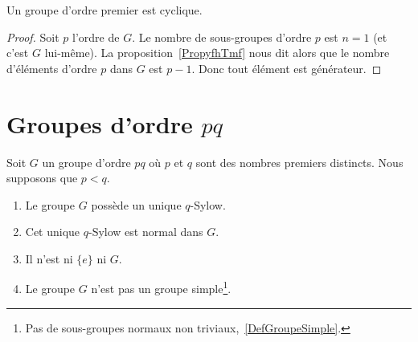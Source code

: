 \begin{corollary}
    Un groupe d'ordre premier est cyclique.
\end{corollary}

\begin{proof}
    Soit \( p\) l'ordre de \( G\). Le nombre de sous-groupes d'ordre \( p\) est \( n=1\) (et c'est \( G\) lui-même). La proposition~\ref{PropyfhTmf} nous dit alors que le nombre d'éléments d'ordre \( p\) dans \( G\) est \( p-1\). Donc tout élément est générateur.
\end{proof}

\section{Groupes d'ordre \texorpdfstring{$ pq$}{pq}}

\begin{lemma}
    Soit \( G\) un groupe d'ordre \( pq\) où \( p\) et \( q\) sont des nombres premiers distincts. Nous supposons que \( p<q\).
    \begin{enumerate}
        \item
            Le groupe \( G\) possède un unique \( q\)-Sylow.
        \item
            Cet unique \( q\)-Sylow est normal dans \( G\).
        \item
            Il n'est ni \( \{ e \}\) ni \( G\).
        \item
            Le groupe \( G\) n'est pas un groupe simple\footnote{Pas de sous-groupes normaux non triviaux,~\ref{DefGroupeSimple}.}.
    \end{enumerate}
\end{lemma}

